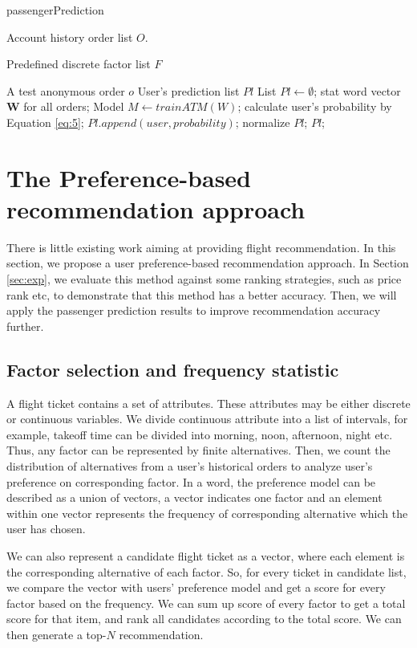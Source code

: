 \documentclass{llncs}
\begin{document}
\begin{algorithm}[htb]
\caption{passengerPrediction}
\begin{algorithmic}[1]
\label{alg:1}
\REQUIRE
Account history order list $O$. \par
Predefined discrete factor list $F$ \par
A test anonymous order $o$
\ENSURE 
User's prediction list $Pl$
\STATE List $Pl \leftarrow \emptyset$;
\STATE stat word vector $\mathbf{W}$ for all orders;
\STATE Model $M \leftarrow trainATM(W)$;
\STATE calculate user's probability by Equation \ref{eq:5};
\STATE $Pl.append(user,probability)$;
\ENDIF
\ENDFOR
\STATE normalize $Pl$;
\RETURN $Pl$;
\end{algorithmic} 
\end{algorithm}

\section{The Preference-based recommendation approach}
\label{sec:rec}
There is little existing work aiming at providing flight recommendation. In this section, we propose a user preference-based recommendation approach. In Section \ref{sec:exp}, we evaluate this method against some ranking strategies, such as price rank etc, to demonstrate that this method has a better accuracy. Then, we will apply the passenger prediction results to improve recommendation accuracy further.

\subsection{Factor selection and frequency statistic}
A flight ticket contains a set of attributes. These attributes may be either discrete or continuous variables. We divide continuous attribute into a list of intervals, for example, takeoff time can be divided into morning, noon, afternoon, night etc. Thus, any factor can be represented by finite alternatives. Then, we count the distribution of alternatives from a user's historical orders to analyze user's preference on corresponding factor. In a word, the preference model can be described as a union of vectors, a vector indicates one factor and an element within one vector represents the frequency of corresponding alternative which the user has chosen.\par
We can also represent a candidate flight ticket as a vector, where each element is the corresponding alternative of each factor. So, for every ticket in candidate list, we compare the vector with users' preference model and get a score for every factor based on the frequency. We can sum up score of every factor to get a total score for that item, and rank all candidates according to the total score. We can then generate a top-$N$ recommendation.\par
\end{document}
